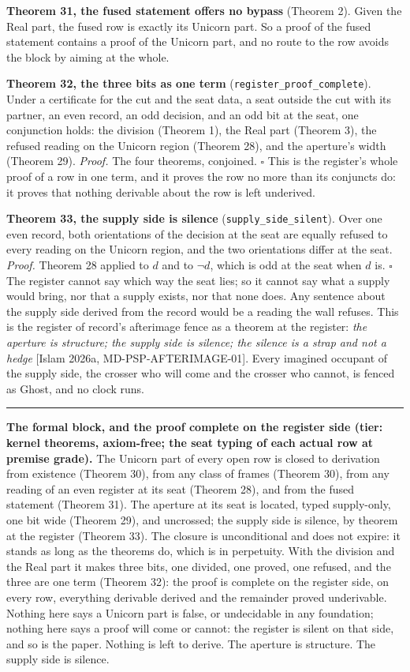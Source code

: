 \documentclass[10pt,twocolumn]{article}
\newenvironment{jbox}{\par\vspace{2pt}\noindent\color{accent}\rule{\columnwidth}{0.8pt}\par\vspace{-2pt}\small}{\par\vspace{2pt}}
\begin{document}
\textbf{Theorem 31, the fused statement offers no bypass} (Theorem 2).
Given the Real part, the fused row is exactly its Unicorn part. So a
proof of the fused statement contains a proof of the Unicorn part, and
no route to the row avoids the block by aiming at the whole.

\textbf{Theorem 32, the three bits as one term}
(\texttt{register\_proof\_complete}). Under a certificate for the cut
and the seat data, a seat outside the cut with its partner, an even
record, an odd decision, and an odd bit at the seat, one conjunction
holds: the division (Theorem 1), the Real part (Theorem 3), the refused
reading on the Unicorn region (Theorem 28), and the aperture's width
(Theorem 29). \emph{Proof.} The four theorems, conjoined. \(\square\)
This is the register's whole proof of a row in one term, and it proves
the row no more than its conjuncts do: it proves that nothing derivable
about the row is left underived.

\textbf{Theorem 33, the supply side is silence}
(\texttt{supply\_side\_silent}). Over one even record, both orientations
of the decision at the seat are equally refused to every reading on the
Unicorn region, and the two orientations differ at the seat.
\emph{Proof.} Theorem 28 applied to \(d\) and to \(\neg d\), which is
odd at the seat when \(d\) is. \(\square\) The register cannot say which
way the seat lies; so it cannot say what a supply would bring, nor that
a supply exists, nor that none does. Any sentence about the supply side
derived from the record would be a reading the wall refuses. This is the
register of record's afterimage fence as a theorem at the register:
\emph{the aperture is structure; the supply side is silence; the silence
is a strap and not a hedge} {[}Islam 2026a, MD-PSP-AFTERIMAGE-01{]}.
Every imagined occupant of the supply side, the crosser who will come
and the crosser who cannot, is fenced as Ghost, and no clock runs.

\begin{jbox}
\textbf{The formal block, and the proof complete on the register side (tier: kernel theorems, axiom-free; the seat typing of each actual row at premise grade).} The Unicorn part of every open row is closed to derivation from existence (Theorem 30), from any class of frames (Theorem 30), from any reading of an even register at its seat (Theorem 28), and from the fused statement (Theorem 31). The aperture at its seat is located, typed supply-only, one bit wide (Theorem 29), and uncrossed; the supply side is silence, by theorem at the register (Theorem 33). The closure is unconditional and does not expire: it stands as long as the theorems do, which is in perpetuity. With the division and the Real part it makes three bits, one divided, one proved, one refused, and the three are one term (Theorem 32): the proof is complete on the register side, on every row, everything derivable derived and the remainder proved underivable. Nothing here says a Unicorn part is false, or undecidable in any foundation; nothing here says a proof will come or cannot: the register is silent on that side, and so is the paper. Nothing is left to derive. The aperture is structure. The supply side is silence.
\end{jbox}
\end{document}
